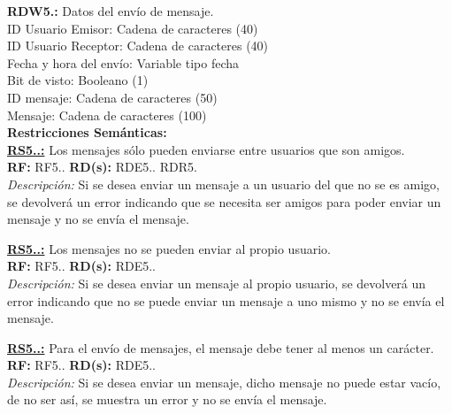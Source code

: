 \textcolor{azul}{\textbf{RDW5.\theRDW:}} Datos del envío de mensaje. \\
\hspace*{1cm} ID Usuario Emisor: Cadena de caracteres (40) \\
\hspace*{1cm} ID Usuario Receptor: Cadena de caracteres (40) \\
\hspace*{1cm} Fecha y hora del envío: Variable tipo fecha \\
\hspace*{1cm} Bit de visto: Booleano (1)\\
\hspace*{1cm} ID mensaje: Cadena de caracteres (50) \\
\hspace*{1cm} Mensaje: Cadena de caracteres (100) \\[12pt]


 \setcounter{RS}{1}
\textbf{\textcolor{verde}{Restricciones Semánticas:}} \\[6pt]
\textbf{\textcolor{verde}{\underline{RS5.\theRF.\theRS:}}} Los mensajes sólo pueden enviarse entre usuarios que son amigos. \\
\textbf{RF:} RF5.\theRF. \textbf{RD(s):} RDE5.\theRDE. RDR5.\theRDR \\
\hspace*{1cm} \textit{Descripción:} Si se desea enviar un mensaje a un usuario del que no se es amigo, se devolverá un error indicando que se necesita ser amigos para poder enviar un mensaje y no se envía el mensaje. \\[6pt]

\textbf{\textcolor{verde}{\underline{RS5.\theRF.\theRS:}}} Los mensajes no se pueden enviar al propio usuario. \\
\textbf{RF:} RF5.\theRF. \textbf{RD(s):} RDE5.\theRDE. \\
\hspace*{1cm} \textit{Descripción:} Si se desea enviar un mensaje al propio usuario, se devolverá un error indicando que no se puede enviar un mensaje a uno mismo y no se envía el mensaje. \\[6pt]

\textbf{\textcolor{verde}{\underline{RS5.\theRF.\theRS:}}} Para el envío de mensajes, el mensaje debe tener al menos un carácter. \\
\textbf{RF:} RF5.\theRF. \textbf{RD(s):} RDE5.\theRDE. \\
\hspace*{1cm} \textit{Descripción:} Si se desea enviar un mensaje, dicho mensaje no puede estar vacío, de no ser así, se muestra un error y no se envía el mensaje. \\ [6pt]

